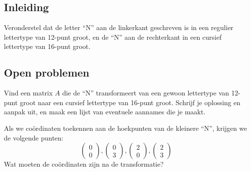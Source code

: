 \documentclass{ximera}
\begin{document}
\author{Alexander Holvoet}

\subsection*{Inleiding}
Veronderstel dat de letter ``N'' aan de linkerkant geschreven is in een regulier lettertype van 12-punt groot, en de ``N'' aan de rechterkant in een cursief lettertype van 16-punt groot.

\begin{image}
\end{image}

\subsection*{Open problemen}

\begin{exercise}
    Vind een matrix $A$ die de ``N'' transformeert van een gewoon lettertype van 12-punt groot naar een cursief lettertype van 16-punt groot.
    Schrijf je oplossing en aanpak uit, en maak een lijst van eventuele aannames die je maakt.
    \begin{hint}
    Als we coördinaten toekennen aan de hoekpunten van de kleinere ``N'', krijgen we de volgende punten:
    \[\begin{pmatrix}0 \\ 0\end{pmatrix}, \begin{pmatrix}0 \\ 3\end{pmatrix}, \begin{pmatrix}2 \\ 0\end{pmatrix}, \begin{pmatrix}2 \\ 3\end{pmatrix}\]
    Wat moeten de coördinaten zijn na de transformatie?
    \end{hint}
\end{exercise}
\end{document}
